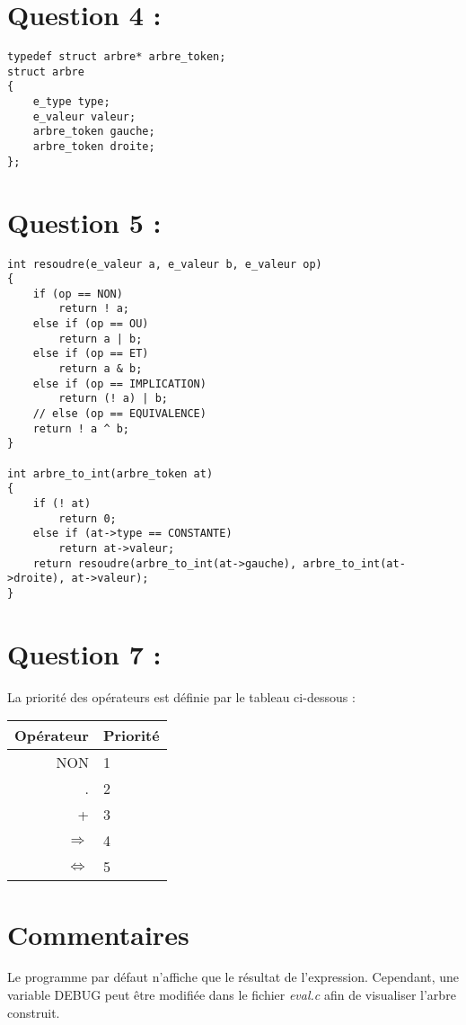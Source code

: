 \documentclass{article}
\begin{document}
\section*{Question 4 :}
\begin{verbatim}
typedef struct arbre* arbre_token;
struct arbre
{
    e_type type;
    e_valeur valeur;
    arbre_token gauche;
    arbre_token droite;
};
\end{verbatim}

\section*{Question 5 :}
\begin{verbatim}
int resoudre(e_valeur a, e_valeur b, e_valeur op)
{
    if (op == NON)
        return ! a;
    else if (op == OU)
        return a | b;
    else if (op == ET)
        return a & b;
    else if (op == IMPLICATION)
        return (! a) | b;
    // else (op == EQUIVALENCE)
    return ! a ^ b;
}

int arbre_to_int(arbre_token at)
{
    if (! at)
        return 0;
    else if (at->type == CONSTANTE)
        return at->valeur;
    return resoudre(arbre_to_int(at->gauche), arbre_to_int(at->droite), at->valeur);
}
\end{verbatim}
\newpage
\section*{Question 7 :}
La priorité des opérateurs est définie par le tableau ci-dessous :
\vspace{5px}

\begin{tabular}[h]{|r|l|}
\hline 
    Opérateur & Priorité\\ 
\hline 
    NON & 1\\
\hline 
    . & 2\\
\hline 
    + & 3\\
\hline 
    $\Rightarrow$ & 4\\
\hline 
    $\Leftrightarrow$ & 5\\
\hline
\end{tabular}

\section*{Commentaires}
Le programme par défaut n'affiche que le résultat de l'expression. Cependant, une variable DEBUG peut être modifiée dans le fichier \textit{eval.c} afin de visualiser l'arbre construit.
\end{document}
